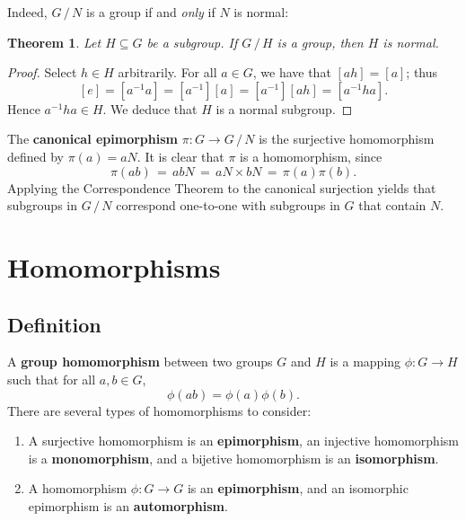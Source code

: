 \documentclass[11pt]{article}
\newtheorem{theorem}{Theorem}
\begin{document}
Indeed, $G \, / \, N$ is a group if and \textit{only} if $N$ is normal:

\begin{adjustwidth}{0.5cm}{}
  \begin{theorem}
    Let $H \subseteq G$ be a subgroup. If $G \, / \, H$ is a group, then $H$ is normal.
  \end{theorem}
  \begin{proof}
    Select $h \in H$ arbitrarily. For all $a \in G$, we have that $[ah] = [a]$; thus
    \[
      [e] = [a^{-1} a] = [a^{-1}] [a] = [a^{-1}] [ah] = [a^{-1}ha].
    \]
    Hence $a^{-1}ha \in H$. We deduce that $H$ is a normal subgroup.
  \end{proof}
\end{adjustwidth}

The \textbf{canonical epimorphism} $\pi : G \to G \, / \, N$ is the surjective homomorphism defined by $\pi(a) = aN$. It is clear that $\pi$ is a homomorphism, since
\[
  \pi(ab) \, = \, abN \, = \, aN \times bN \, = \, \pi(a) \pi(b).
\]
Applying the Correspondence Theorem to the canonical surjection yields that subgroups in $G \, / \, N$ correspond one-to-one with subgroups in $G$ that contain $N$.


\section{Homomorphisms}


\subsection{Definition}

A \textbf{group homomorphism} between two groups $G$ and $H$ is a mapping $\phi : G \to H$  such that for all $a, b \in G$,
\[
  \phi(ab) = \phi(a) \phi(b).
\]
There are several types of homomorphisms to consider:
\begin{enumerate}
  \item A surjective homomorphism is an \textbf{epimorphism}, an injective homomorphism is a \textbf{monomorphism}, and a bijetive homomorphism is an \textbf{isomorphism}.
  \item A homomorphism $\phi : G \to G$ is an \textbf{epimorphism}, and an isomorphic epimorphism is an \textbf{automorphism}.
\end{enumerate}
\end{document}
